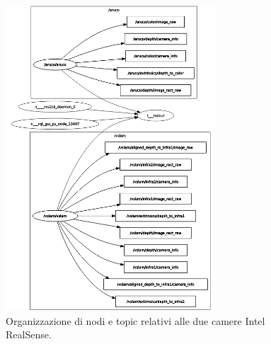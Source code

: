 \begin{figure}
    \centering
    \includegraphics[width=0.7\textwidth]{figs/chapter3/cameranodes.png}
    \caption{Organizzazione di nodi e topic relativi alle due camere Intel RealSense.}
    \label{fig:cameranodes}
\end{figure}

\indent
